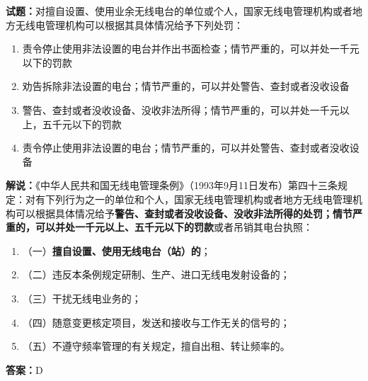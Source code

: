 \documentclass{ctexbook}
\begin{document}
\textbf{试题：}对擅自设置、使用业余无线电台的单位或个人，国家无线电管理机构或者地方无线电管理机构可以根据其具体情况给予下列处罚：
\begin{enumerate}[leftmargin=3em]
  \item 责令停止使用非法设置的电台并作出书面检查；情节严重的，可以并处一千元以下的罚款
  \item 劝告拆除非法设置的电台；情节严重的，可以并处警告、查封或者没收设备
  \item 警告、查封或者没收设备、没收非法所得；情节严重的，可以并处一千元以上，五千元以下的罚款
  \item 责令停止使用非法设置的电台；情节严重的，可以并处警告、查封或者没收设备
\end{enumerate}
\noindent\textbf{解说：}《中华人民共和国无线电管理条例》（1993年9月11日发布）第四十三条规定：对有下列行为之一的单位和个人，国家无线电管理机构或者地方无线电管理机构可以根据具体情况给予\textbf{警告、查封或者没收设备、没收非法所得的处罚；情节严重的，可以并处一千元以上、五千元以下的罚款}或者吊销其电台执照：
\begin{enumerate}[leftmargin=3em, label=]
  \item（一）\textbf{擅自设置、使用无线电台（站）的}；
  \item（二）违反本条例规定研制、生产、进口无线电发射设备的；
  \item（三）干扰无线电业务的；
  \item（四）随意变更核定项目，发送和接收与工作无关的信号的；
  \item（五）不遵守频率管理的有关规定，擅自出租、转让频率的。
\end{enumerate}
\textbf{答案：}D


\vspace{1em}
\end{document}
